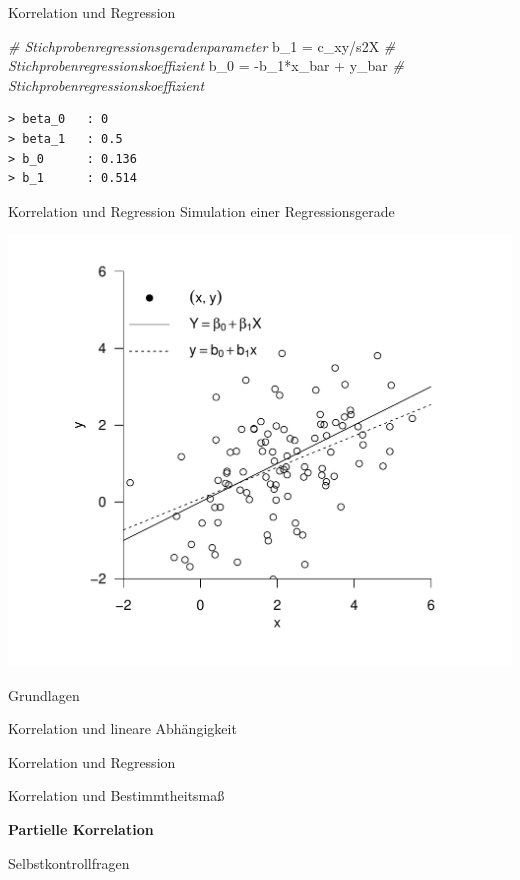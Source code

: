 \documentclass[
  8pt,
  ignorenonframetext,
]{beamer}
\newenvironment{Shaded}{\begin{snugshade}}{\end{snugshade}}
\newcommand{\CommentTok}[1]{\textcolor[rgb]{0.56,0.35,0.01}{\textit{#1}}}
\newcommand{\NormalTok}[1]{#1}
\newcommand{\OtherTok}[1]{\textcolor[rgb]{0.56,0.35,0.01}{#1}}
\newcommand{\SpecialCharTok}[1]{\textcolor[rgb]{0.00,0.00,0.00}{#1}}
\begin{document}
\begin{frame}[fragile]{Korrelation und Regression}
\begin{Shaded}
\begin{Highlighting}[]
\CommentTok{\# Stichprobenregressionsgeradenparameter}
\NormalTok{b\_1    }\OtherTok{=}\NormalTok{ c\_xy}\SpecialCharTok{/}\NormalTok{s2X                               }\CommentTok{\# Stichprobenregressionskoeffizient}
\NormalTok{b\_0    }\OtherTok{=} \SpecialCharTok{{-}}\NormalTok{b\_1}\SpecialCharTok{*}\NormalTok{x\_bar }\SpecialCharTok{+}\NormalTok{ y\_bar                     }\CommentTok{\# Stichprobenregressionskoeffizient}
\end{Highlighting}
\end{Shaded}

\begin{verbatim}
> beta_0   : 0 
> beta_1   : 0.5 
> b_0      : 0.136 
> b_1      : 0.514
\end{verbatim}
\end{frame}

\begin{frame}{Korrelation und Regression}
\protect\hypertarget{korrelation-und-regression-7}{}
Simulation einer Regressionsgerade \vspace{3mm}

\begin{center}\includegraphics[width=0.6\linewidth]{2_Abbildungen/alm_2_stichprobenregression} \end{center}
\end{frame}

\begin{frame}{}
\protect\hypertarget{section-7}{}
\vfill
\large

Grundlagen

Korrelation und lineare Abhängigkeit

Korrelation und Regression

Korrelation und Bestimmtheitsmaß

\textbf{Partielle Korrelation}

Selbstkontrollfragen

\vfill
\end{frame}
\end{document}
